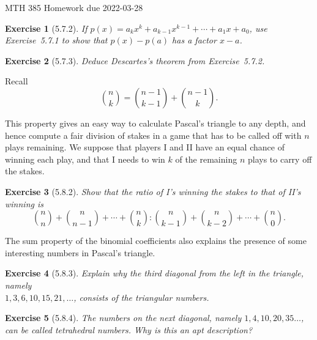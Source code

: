 \documentclass[12pt]{article}
\theoremstyle{plain}
\newtheorem{ex}{Exercise}
\begin{document}
MTH 385 \qquad Homework due 2022-03-28

\begin{ex} [5.7.2]
  If $p(x)=a_kx^k+a_{k-1}x^{k-1}+\cdots+a_1x+a_0$, use Exercise~5.7.1 to show that $p(x)-p(a)$ has a factor $x-a$.
\end{ex}

\begin{ex} [5.7.3]
  Deduce Descartes's theorem from Exercise~5.7.2.
\end{ex}

Recall
\[
  \binom{n}{k}=\binom{n-1}{k-1}+\binom{n-1}{k}.
\]

This property gives an easy way to calculate Pascal's triangle to any depth, and hence compute a fair division of stakes in a game that has to be called off with $n$ plays remaining. We suppose that players I and II have an equal chance of winning each play, and that I needs to win $k$ of the remaining $n$ plays to carry off the stakes.

\begin{ex} [5.8.2]
  Show that the ratio of I's winning the stakes to that of II's winning is
  \[
    \binom{n}{n}+\binom{n}{n-1}+\cdots+\binom{n}{k}:\binom{n}{k-1}+\binom{n}{k-2}+\cdots+\binom{n}{0}.
  \]
\end{ex}

The sum property of the binomial coefficients also explains the presence of some interesting numbers in Pascal's triangle.

\begin{ex} [5.8.3]
  Explain why the third diagonal from the left in the triangle, namely \\
  $1,3,6,10,15,21,\ldots$, consists of the triangular numbers.
\end{ex}

\begin{ex} [5.8.4]
  The numbers on the next diagonal, namely $1,4,10,20,35\ldots$, can be called \emph{tetrahedral numbers}. Why is this an apt description?
\end{ex}
\end{document}
